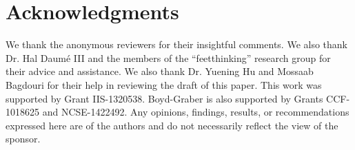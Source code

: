 \section{Acknowledgments}
\label{sec:acknowledgments} 

We thank the anonymous reviewers for their
insightful comments. We also thank Dr. Hal Daum\'{e} III and the members of the ``feetthinking'' research group for 
their advice and assistance. We also thank Dr. Yuening Hu and Mossaab Bagdouri for their help in reviewing the draft of this paper. This work was supported by  Grant IIS-1320538.
Boyd-Graber is also supported by  Grants CCF-1018625 and NCSE-1422492. Any opinions,
findings, results, or recommendations expressed here are of
the authors and do not necessarily reflect the view of the sponsor.
